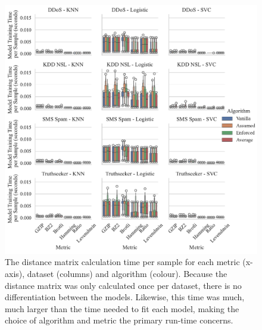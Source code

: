\documentclass[conference]{IEEEtran}
\begin{document}
\begin{figure}[htb]
    \includegraphics[width=\textwidth]{images/train_time_vs_algorithm.pdf}
    \caption{The distance matrix calculation time per sample for each metric (x-axis), dataset (columns) and algorithm (colour). Because the distance matrix was only calculated once per dataset, there is no differentiation between the models. Likewise, this time was much, much larger than the time needed to fit each model, making the choice of algorithm and metric the primary run-time concerns.}
    \label{fig:train_time}
\end{figure}
\end{document}
